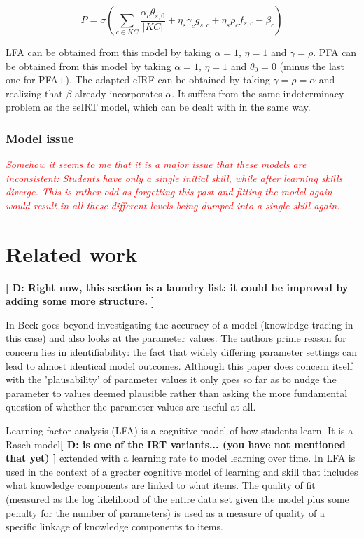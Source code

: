 \documentclass{scrartcl}
\newcommand\todo[1]{\textit{\textcolor{red}{#1}}}
\providecommand{\comm}[1]{{\bf[ #1 ]}}
\providecommand{\commd}[1]{\comm{D: {#1}}}
\begin{document}
\begin{equation}
P = \sigma(\sum_{c \in KC}\frac{\alpha_c \theta_{s,0}}{|KC|}+\eta_{s} \gamma_{c} g_{s,c} + \eta_{s}\rho_{c} f_{s,c} - \beta_{c})
\end{equation}

LFA can be obtained from this model by taking $\alpha=1$, $\eta=1$ and $\gamma=\rho$. PFA can be obtained from this model by taking $\alpha=1$, $\eta=1$ and $\theta_{0}=0$ (minus the last one for PFA+). The adapted eIRF can be obtained by taking $\gamma=\rho=\alpha$ and realizing that $\beta$ already incorporates $\alpha$. It suffers from the same indeterminacy problem as the seIRT model, which can be dealt with in the same way.

\subsubsection{Model issue}
\todo{Somehow it seems to me that it is a major issue that these models are inconsistent: Students have only a single initial skill, while after learning skills diverge. This is rather odd as forgetting this past and fitting the model again would result in all these different levels being dumped into a single skill again.}


\section{Related work}
\label{sec:RW}
\commd{Right now, this section is a laundry list: it could be improved by adding some more structure.}

In \cite{knowledgeproblem} Beck goes beyond investigating the accuracy of a model (knowledge tracing in this case) and also looks at the parameter values. The authors prime reason for concern lies in identifiability: the fact that widely differing parameter settings can lead to almost identical model outcomes. Although this paper does concern itself with the 'plausability' of parameter values it only goes so far as to nudge the parameter to values deemed plausible rather than asking the more fundamental question of whether the parameter values are useful at all.

Learning factor analysis (LFA) \cite{lfa} is a cognitive model of how students learn. It is a Rasch model\commd{is one of the IRT variants... (you have not mentioned that yet)} extended with a learning rate to model learning over time. In \cite{lfa} LFA is used in the context of a greater cognitive model of learning and skill that includes what knowledge components are linked to what items. The quality of fit (measured as the log likelihood of the entire data set given the model plus some penalty for the number of parameters) is used as a measure of quality of a specific linkage of knowledge components to items.
\end{document}
